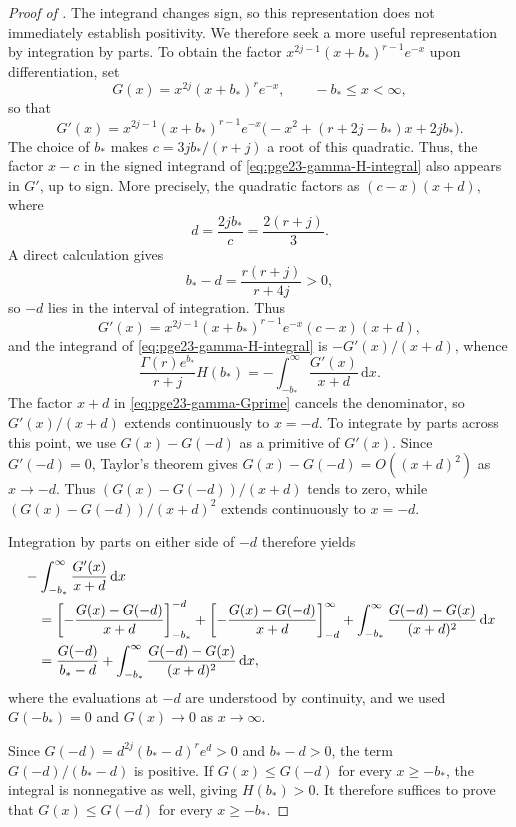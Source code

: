 \documentclass[11pt]{article}
\theoremstyle{remark}
\numberwithin{equation}{section}
\newcommand{\dd}{\,\mathrm d}
\begin{document}
\begin{proof}[Proof of ]
  The integrand changes sign, so this representation does not immediately
  establish positivity. We therefore seek a more useful representation by
  integration by parts. To obtain the factor
  $x^{2j-1}(x+b_*)^{r-1}e^{-x}$ upon differentiation, set
  \begin{equation*}
    G(x)=x^{2j}(x+b_*)^re^{-x},
    \qquad -b_*\le x<\infty,
  \end{equation*}
  so that
  \[
    G'(x)=x^{2j-1}(x+b_*)^{r-1}e^{-x}
    \bigl(-x^2+(r+2j-b_*)x+2jb_*\bigr).
  \]
  The choice of $b_*$ makes $c=3jb_*/(r+j)$ a root of this quadratic.
  Thus, the factor $x-c$ in the signed integrand of
  \eqref{eq:pge23-gamma-H-integral} also appears in $G'$, up to sign.
  More precisely, the quadratic factors as $(c-x)(x+d)$, where
  \[
    d=\frac{2jb_*}{c}=\frac{2(r+j)}{3}.
  \]
  A direct calculation gives
  \[
    b_*-d=\frac{r(r+j)}{r+4j}>0,
  \]
  so $-d$ lies in the interval of integration.
  Thus
  \begin{equation}\label{eq:pge23-gamma-Gprime}
    G'(x)=x^{2j-1}(x+b_*)^{r-1}e^{-x}(c-x)(x+d),
  \end{equation}
  and the integrand of \eqref{eq:pge23-gamma-H-integral} is $-G'(x)/(x+d)$, whence
  \[
    \frac{\Gamma(r)e^{b_*}}{r+j}H(b_*)
    =-\int_{-b_*}^{\infty}\frac{G'(x)}{x+d}\dd x.
  \]
  The factor $x+d$ in \eqref{eq:pge23-gamma-Gprime} cancels the denominator,
  so $G'(x)/(x+d)$ extends continuously to $x=-d$.
  To integrate by parts across this point, we use $G(x)-G(-d)$ as a
  primitive of $G'(x)$. Since $G'(-d)=0$, Taylor's theorem gives
  $G(x)-G(-d)=O((x+d)^2)$ as $x\to-d$. Thus
  $(G(x)-G(-d))/(x+d)$ tends to zero, while
  $(G(x)-G(-d))/(x+d)^2$ extends continuously to $x=-d$.

  Integration by parts on either side of $-d$ therefore yields
  \begin{align}
    &-\int_{-b_*}^{\infty}\frac{G'(x)}{x+d}\dd x\notag\\
    &\quad=\left[-\frac{G(x)-G(-d)}{x+d}\right]_{-b_*}^{-d}
    +\left[-\frac{G(x)-G(-d)}{x+d}\right]_{-d}^{\infty}
    +\int_{-b_*}^{\infty}\frac{G(-d)-G(x)}{(x+d)^2}\dd x\notag\\
    &\quad=\frac{G(-d)}{b_*-d}
    +\int_{-b_*}^{\infty}\frac{G(-d)-G(x)}{(x+d)^2}\dd x,
    \label{eq:pge23-gamma-ibp-max}
  \end{align}
  where the evaluations at $-d$ are understood by continuity, and we used
  $G(-b_*)=0$ and $G(x)\to0$ as $x\to\infty$.

  Since $G(-d)=d^{2j}(b_*-d)^re^{d}>0$ and $b_*-d>0$, the term
  $G(-d)/(b_*-d)$ is positive. If $G(x)\le G(-d)$ for every
  $x\ge-b_*$, the integral is nonnegative as well, giving $H(b_*)>0$.
  It therefore suffices to prove that $G(x)\le G(-d)$ for every $x\ge-b_*$.


\end{proof}
\end{document}
